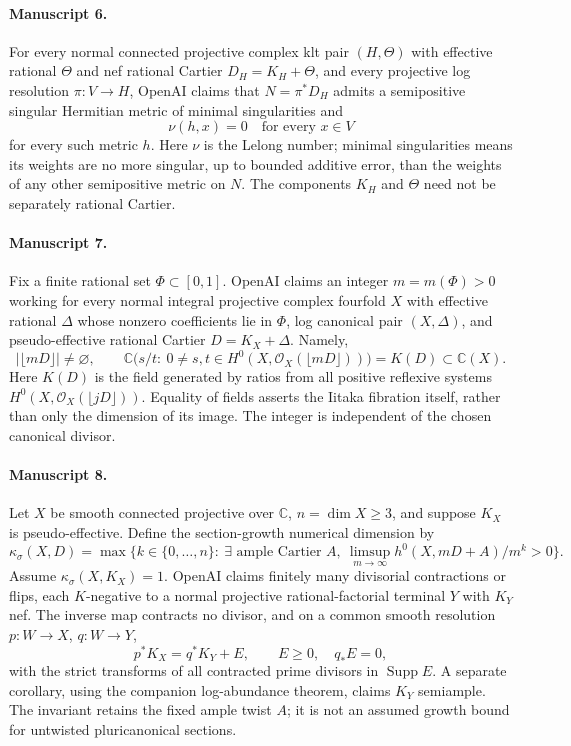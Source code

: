 \documentclass[11pt]{article}
\begin{document}
\paragraph{Manuscript 6.}
For every normal connected projective complex klt pair $(H,\Theta)$ with effective rational $\Theta$ and nef rational Cartier $D_H=K_H+\Theta$, and every projective log resolution $\pi:V\to H$, OpenAI claims that $N=\pi^*D_H$ admits a semipositive singular Hermitian metric of minimal singularities and
\[
\nu(h,x)=0\quad\text{for every }x\in V
\]
for every such metric $h$. Here $\nu$ is the Lelong number; minimal singularities means its weights are no more singular, up to bounded additive error, than the weights of any other semipositive metric on $N$. The components $K_H$ and $\Theta$ need not be separately rational Cartier.

\paragraph{Manuscript 7.}
Fix a finite rational set $\Phi\subset[0,1]$. OpenAI claims an integer $m=m(\Phi)>0$ working for every normal integral projective complex fourfold $X$ with effective rational $\Delta$ whose nonzero coefficients lie in $\Phi$, log canonical pair $(X,\Delta)$, and pseudo-effective rational Cartier $D=K_X+\Delta$. Namely,
\[
|\lfloor mD\rfloor|\ne\varnothing,\qquad
\mathbb C\bigl(s/t:\ 0\ne s,t\in H^0(X,\mathcal O_X(\lfloor mD\rfloor))\bigr)=K(D)\subset\mathbb C(X).
\]
Here $K(D)$ is the field generated by ratios from all positive reflexive systems $H^0(X,\mathcal O_X(\lfloor jD\rfloor))$. Equality of fields asserts the Iitaka fibration itself, rather than only the dimension of its image. The integer is independent of the chosen canonical divisor.

\paragraph{Manuscript 8.}
Let $X$ be smooth connected projective over $\mathbb C$, $n=\dim X\ge3$, and suppose $K_X$ is pseudo-effective. Define the section-growth numerical dimension by
\[
\kappa_\sigma(X,D)=\max\{k\in\{0,\ldots,n\}:\ \exists\text{ ample Cartier }A,\ \limsup_{m\to\infty}h^0(X,mD+A)/m^k>0\}.
\]
Assume $\kappa_\sigma(X,K_X)=1$. OpenAI claims finitely many divisorial contractions or flips, each $K$-negative to a normal projective rational-factorial terminal $Y$ with $K_Y$ nef. The inverse map contracts no divisor, and on a common smooth resolution $p:W\to X$, $q:W\to Y$,
\[
p^*K_X=q^*K_Y+E,\qquad E\ge0,\quad q_*E=0,
\]
with the strict transforms of all contracted prime divisors in $\operatorname{Supp}E$. A separate corollary, using the companion log-abundance theorem, claims $K_Y$ semiample. The invariant retains the fixed ample twist $A$; it is not an assumed growth bound for untwisted pluricanonical sections.
\end{document}
